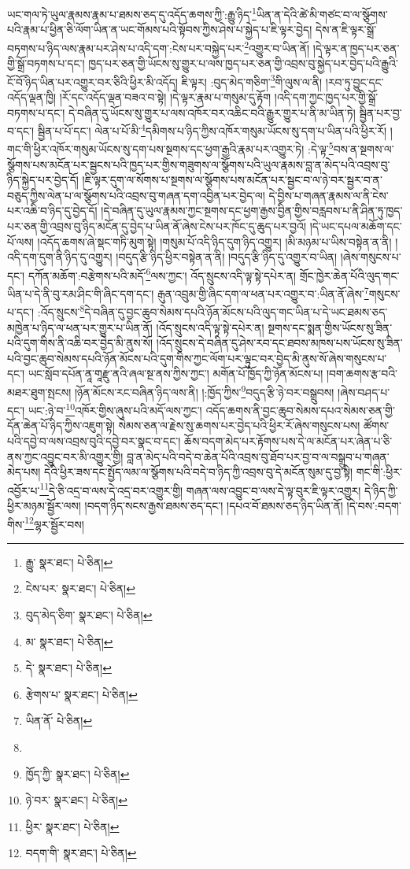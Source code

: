 ཡང་གལ་ཏེ་ཡུལ་རྣམས་རྣམ་པ་ཐམས་ཅད་དུ་འདོད་ཆགས་ཀྱི་:རྒྱུ་ཉིད་\footnote{རྒྱུ་  སྣར་ཐང་།  པེ་ཅིན། }ཡིན་ན་དེའི་ཚེ་མི་གཙང་བ་ལ་སྩོགས་པའི་རྣམ་པ་ཕྱིན་ཅི་ལོག་ཡིན་ན་ཡང་གོམས་པའི་སྟོབས་ཀྱིས་ཤེས་པ་སྐྱེད་པ་ཇི་ལྟར་བྱེད། དེས་ན་ཇི་ལྟར་སྒྲོ་བཏགས་པ་ཉིད་ལས་རྣམ་པར་ཤེས་པ་འདི་དག་:ངེས་པར་བསྐྱེད་པར་\footnote{ངེས་པར་  སྣར་ཐང་།  པེ་ཅིན། }འགྱུར་བ་ཡིན་ནོ། །དེ་ལྟར་ན་ཁྱད་པར་ཅན་གྱི་སྒྲོ་བཏགས་པ་དང་། ཁྱད་པར་ཅན་གྱི་ཡོངས་སུ་གྱུར་པ་ལས་ཁྱད་པར་ཅན་གྱི་འབྲས་བུ་སྐྱེད་པར་བྱེད་པའི་རྒྱུའི་ངོ་བོ་ཉིད་ཡིན་པར་འགྱུར་བར་ཅིའི་ཕྱིར་མི་འདོད། ཇི་ལྟར། :བུད་མེད་གཅིག་\footnote{བུད་མེད་ཅིག་  སྣར་ཐང་།  པེ་ཅིན། }གི་ལུས་ལ་ནི། །རབ་ཏུ་བྱུང་དང་འདོད་ལྡན་ཁྱི། །རོ་དང་འདོད་ལྡན་བཟའ་བ་སྟེ། །དེ་ལྟར་རྣམ་པ་གསུམ་དུ་རྟོག །འདི་དག་ཀྱང་ཁྱད་པར་གྱི་སྒྲོ་བཏགས་པ་དང་། དེ་བཞིན་དུ་ཡོངས་སུ་གྱུར་པ་ལས་འཁོར་བར་འཆིང་བའི་རྒྱུར་གྱུར་པ་ནི་མ་ཡིན་ཏེ། སྦྱིན་པར་བྱ་བ་དང་། སྦྱིན་པ་པོ་དང་། ལེན་པ་པོ་མི་\footnote{མ་  སྣར་ཐང་།  པེ་ཅིན། }དམིགས་པ་ཉིད་ཀྱིས་འཁོར་གསུམ་ཡོངས་སུ་དག་པ་ཡིན་པའི་ཕྱིར་རོ། །གང་གི་ཕྱིར་འཁོར་གསུམ་ཡོངས་སུ་དག་པས་སྔགས་དང་ཕྱག་རྒྱའི་རྣམ་པར་འགྱུར་ཏེ། :དེ་ལྟ་\footnote{དེ་  སྣར་ཐང་།  པེ་ཅིན། }བས་ན་སྔགས་ལ་སྩོགས་པས་མངོན་པར་སྦྱངས་པའི་ཁྱད་པར་གྱིས་གཟུགས་ལ་སྩོགས་པའི་ཡུལ་རྣམས་བླ་ན་མེད་པའི་འབྲས་བུ་ཉིད་སྐྱེད་པར་བྱེད་དོ། །ཇི་ལྟར་དུག་ལ་སོགས་པ་སྔགས་ལ་སྩོགས་པས་མངོན་པར་སྦྱང་བ་ལ་ཉེ་བར་སྦྱར་བ་ན་བཅུད་ཀྱིས་ལེན་པ་ལ་སྩོགས་པའི་འབྲས་བུ་གཞན་དག་འབྱིན་པར་བྱེད་ལ། དེ་བྱིས་པ་གཞན་རྣམས་ལ་ནི་ངེས་པར་འཆི་བ་ཉིད་དུ་བྱེད་དོ། །དེ་བཞིན་དུ་ཡུལ་རྣམས་ཀྱང་སྔགས་དང་ཕྱག་རྒྱས་བྱིན་གྱིས་བརླབས་པ་ནི་ཤིན་ཏུ་ཁྱད་པར་ཅན་གྱི་འབྲས་བུ་ཉིད་མངོན་དུ་བྱེད་པ་ཡིན་ནོ་ཞེས་ངེས་པར་ཁོང་དུ་ཆུད་པར་བྱའོ། །དེ་ཡང་དཔལ་མཆོག་དང་པོ་ལས། །འདོད་ཆགས་ཞེ་སྡང་གཏི་མུག་སྟེ། །གསུམ་པོ་འདི་ཉིད་དུག་ཉིད་འགྱུར། །མི་མཉམ་པ་ཡིས་བསྟེན་ན་ནི། །འདི་དག་དུག་ནི་ཉིད་དུ་འགྱུར། །བདུད་རྩི་ཉིད་ཕྱིར་བསྟེན་ན་ནི། །བདུད་རྩི་ཉིད་དུ་འགྱུར་བ་ཡིན། །ཞེས་གསུངས་པ་དང་། དཀོན་མཆོག་:བརྩེགས་པའི་མདོ་\footnote{རྩེགས་པ་  སྣར་ཐང་།  པེ་ཅིན། }ལས་ཀྱང་། འོད་སྲུངས་འདི་ལྟ་སྟེ་དཔེར་ན། གྲོང་ཁྱེར་ཆེན་པོའི་ལུད་གང་ཡིན་པ་དེ་ནི་བུ་རམ་ཤིང་གི་ཞིང་དག་དང་། རྒུན་འབྲུམ་གྱི་ཞིང་དག་ལ་ཕན་པར་འགྱུར་བ་:ཡིན་ནོ་ཞེས་\footnote{ཡིན་ནོ་  པེ་ཅིན། }གསུངས་པ་དང་། :འོད་སྲུངས་\footnote{}དེ་བཞིན་དུ་བྱང་ཆུབ་སེམས་དཔའི་ཉོན་མོངས་པའི་ལུད་གང་ཡིན་པ་དེ་ཡང་ཐམས་ཅད་མཁྱེན་པ་ཉིད་ལ་ཕན་པར་གྱུར་པ་ཡིན་ནོ། །འོད་སྲུངས་འདི་ལྟ་སྟེ་དཔེར་ན། སྔགས་དང་སྨན་གྱིས་ཡོངས་སུ་ཟིན་པའི་དུག་གིས་ནི་འཆི་བར་བྱེད་མི་ནུས་སོ། །འོད་སྲུངས་དེ་བཞིན་དུ་ཤེས་རབ་དང་ཐབས་མཁས་པས་ཡོངས་སུ་ཟིན་པའི་བྱང་ཆུབ་སེམས་དཔའི་ཉོན་མོངས་པའི་དུག་གིས་ཀྱང་ལོག་པར་ལྟུང་བར་བྱེད་མི་ནུས་སོ་ཞེས་གསུངས་པ་དང་། ཡང་སློབ་དཔོན་ནཱ་གཱརྫུ་ནའི་ཞལ་སྔ་ནས་ཀྱིས་ཀྱང་། མགོན་པོ་ཁྱོད་ཀྱི་ཉོན་མོངས་པ། །བག་ཆགས་རྩ་བའི་མཐར་ཐུག་སྤངས། །ཉོན་མོངས་རང་བཞིན་ཉིད་ལས་ནི། །:ཁྱོད་ཀྱིས་\footnote{ཁྱོད་ཀྱི་  སྣར་ཐང་།  པེ་ཅིན། }བདུད་རྩི་ཉེ་བར་བསྒྲུབས། །ཞེས་བཤད་པ་དང་། ཡང་:ཉེ་བ་\footnote{ཉེ་བར་  སྣར་ཐང་།  པེ་ཅིན། }འཁོར་གྱིས་ཞུས་པའི་མདོ་ལས་ཀྱང་། འདོད་ཆགས་ནི་བྱང་ཆུབ་སེམས་དཔའ་སེམས་ཅན་གྱི་དོན་ཆེན་པོ་ཉིད་ཀྱིས་འཇུག་སྟེ། སེམས་ཅན་ལ་རྗེས་སུ་ཆགས་པར་བྱེད་པའི་ཕྱིར་རོ་ཞེས་གསུངས་པས། ཚོགས་པའི་དབྱེ་བ་ལས་འབྲས་བུའི་དབྱེ་བར་སྣང་བ་དང་། ཆོས་བདག་མེད་པར་རྟོགས་པས་དེ་ལ་མངོན་པར་ཞེན་པ་ཅི་ནས་ཀྱང་འབྱུང་བར་མི་འགྱུར་གྱི། བླ་ན་མེད་པའི་བདེ་བ་ཆེན་པོའི་འབྲས་བུ་ཐོབ་པར་བྱ་བ་ལ་བསྒྲུབ་པ་གཞན་མེད་པས། དེའི་ཕྱིར་ཟས་དང་སྤྱོད་ལམ་ལ་སྩོགས་པའི་བདེ་བ་ཉིད་ཀྱི་འབྲས་བུ་དེ་མངོན་སུམ་དུ་བྱ་སྟེ། གང་གི་:ཕྱིར་འབྱོར་པ་\footnote{ཕྱིར་  སྣར་ཐང་།  པེ་ཅིན། }དེ་ཅི་འདྲ་བ་ལས་དེ་འདྲ་བར་འགྱུར་གྱི། གཞན་ལས་འབྱུང་བ་ལས་དེ་ལྟ་བུར་ཇི་ལྟར་འགྱུར། དེ་ཉིད་ཀྱི་ཕྱིར་མཉམ་སྦྱོར་ལས། །བདག་ཉིད་སངས་རྒྱས་ཐམས་ཅད་དང་། །དཔའ་བོ་ཐམས་ཅད་ཉིད་ཡིན་ནོ། །དེ་བས་:བདག་གིས་\footnote{བདག་གི་  སྣར་ཐང་།  པེ་ཅིན། }ལྷར་སྦྱོར་བས། 
